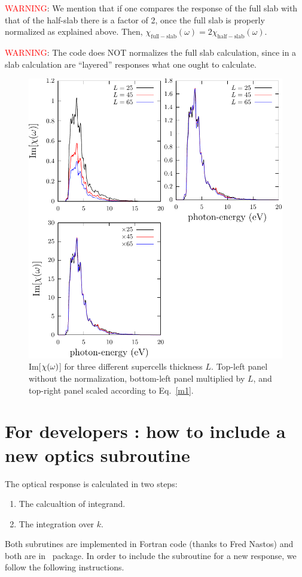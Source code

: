 \documentclass[12pt]{article}
\numberwithin{equation}{section}
\begin{document}
\textcolor{red}{WARNING}: 
We mention that if one compares the response of the full slab with
that of the half-slab there is a factor of 2, once the full slab is
properly normalized as explained above. Then, 
$\chi_{\mathrm{full-slab}}(\omega)
=2 \chi_{\mathrm{half-slab}}(\omega)
$.

\textcolor{red}{WARNING}:
The code does NOT normalizes the full slab calculation, since  in a
slab calculation are ``layered'' responses what one ought to calculate. 
\begin{figure}[t]
\begin{center}
\includegraphics[scale=0.6]{plots/chi-layer}
\end{center}
\caption{Im[$\chi(\omega)$] for three different supercells thickness
  $L$. Top-left panel without the normalization, bottom-left panel multiplied by
  $L$, and top-right panel scaled according to Eq.~\eqref{m1}. 
}
\label{chil}
\end{figure}


\section{For developers : how to include a new optics subroutine}
The optical response is calculated in two steps:\\
\begin{enumerate}
\item The calcualtion of integrand.
\item The integration over $k$.
\end{enumerate}
Both subrutines are implemented in Fortran code (thanks to Fred Nastos) and both 
are in \tiniba~package. In order to include the  subroutine for a new
response, we follow the following instructions. 
 
\end{document}
